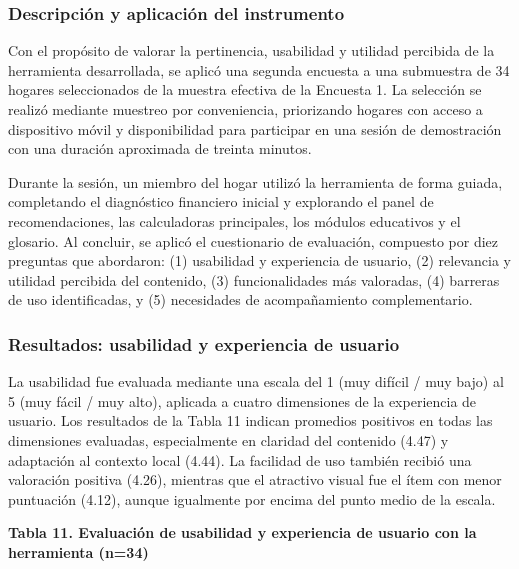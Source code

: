 \documentclass[12pt,letterpaper]{article}
\begin{document}
\subsubsection{\texorpdfstring{\textbf{Descripción y aplicación del instrumento}}{Descripción y aplicación del instrumento}}\label{descripciuxf3n-y-aplicaciuxf3n-del-instrumento}

Con el propósito de valorar la pertinencia, usabilidad y utilidad percibida de la herramienta desarrollada, se aplicó una segunda encuesta a una submuestra de 34 hogares seleccionados de la muestra efectiva de la Encuesta 1. La selección se realizó mediante muestreo por conveniencia, priorizando hogares con acceso a dispositivo móvil y disponibilidad para participar en una sesión de demostración con una duración aproximada de treinta minutos.

Durante la sesión, un miembro del hogar utilizó la herramienta de forma guiada, completando el diagnóstico financiero inicial y explorando el panel de recomendaciones, las calculadoras principales, los módulos educativos y el glosario. Al concluir, se aplicó el cuestionario de evaluación, compuesto por diez preguntas que abordaron: (1) usabilidad y experiencia de usuario, (2) relevancia y utilidad percibida del contenido, (3) funcionalidades más valoradas, (4) barreras de uso identificadas, y (5) necesidades de acompañamiento complementario.

\subsubsection{\texorpdfstring{\textbf{Resultados: usabilidad y experiencia de usuario}}{Resultados: usabilidad y experiencia de usuario}}\label{resultados-usabilidad-y-experiencia-de-usuario}

La usabilidad fue evaluada mediante una escala del 1 (muy difícil / muy bajo) al 5 (muy fácil / muy alto), aplicada a cuatro dimensiones de la experiencia de usuario. Los resultados de la Tabla 11 indican promedios positivos en todas las dimensiones evaluadas, especialmente en claridad del contenido (4.47) y adaptación al contexto local (4.44). La facilidad de uso también recibió una valoración positiva (4.26), mientras que el atractivo visual fue el ítem con menor puntuación (4.12), aunque igualmente por encima del punto medio de la escala.

\textbf{Tabla 11. Evaluación de usabilidad y experiencia de usuario con la herramienta (n=34)}
\end{document}
